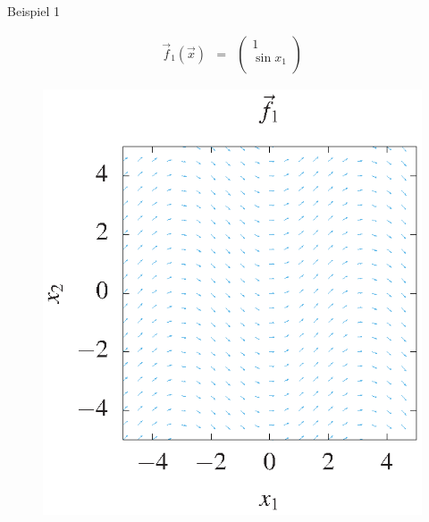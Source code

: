 \documentclass[german]{beamer}
\newcommand{\bq}{\begin{eqnarray*}}
\newcommand{\eq}{\end{eqnarray*}}
\begin{document}
\begin{frame}{Beispiel 1}

\bq
 \vec{f}_1(\vec{x}) & = & \left( \begin{array}{c} 1 \\ \sin x_1 \\ \end{array} \right)
\eq
\begin{figure}
\includegraphics[scale=0.7]{f1}
\end{figure}

\end{frame}
\end{document}

